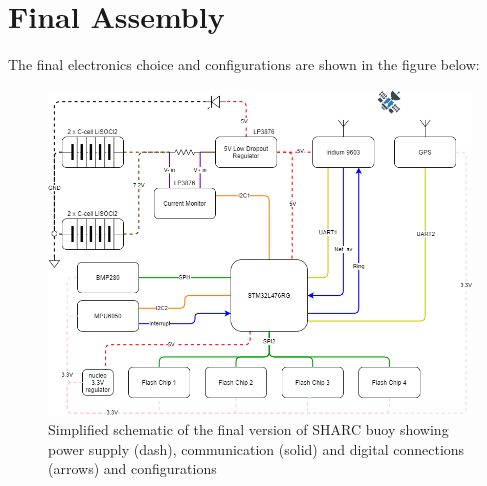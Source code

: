 \section{Final Assembly}
\label{sec:ch3_final_assembly}
The final electronics choice and configurations are shown in the figure below:

\begin{landscape}\centering
\vspace*{\fill}
\begin{figure}[htpb]
  \centering
  \includegraphics[height=0.6\textheight, width=1.2\textwidth]{figs/SHARC_Final.png}
  \caption{Simplified schematic of the final version of SHARC buoy showing power supply (dash), communication (solid) and digital connections (arrows) and configurations}
    \label{fig:sharc_final}
\end{figure}
\vfill
\end{landscape}


